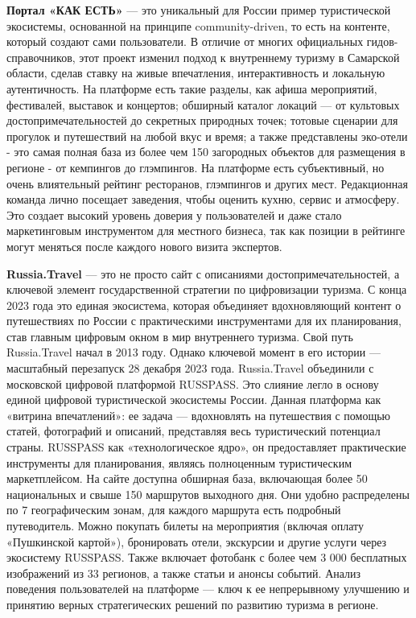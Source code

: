 \textbf{Портал «КАК ЕСТЬ»} --- это уникальный для России пример туристической экосистемы, основанной на принципе community-driven, то есть на контенте, который создают сами пользователи. В отличие от многих официальных гидов-справочников, этот проект изменил подход к внутреннему туризму в Самарской области, сделав ставку на живые впечатления, интерактивность и локальную аутентичность. На платформе есть такие разделы, как афиша мероприятий, фестивалей, выставок и концертов; обширный каталог локаций — от культовых достопримечательностей до секретных природных точек; тотовые сценарии для прогулок и путешествий на любой вкус и время; а также представлены эко-отели - это самая полная база из более чем 150 загородных объектов для размещения в регионе - от кемпингов до глэмпингов. На платформе есть субъективный, но очень влиятельный рейтинг ресторанов, глэмпингов и других мест. Редакционная команда лично посещает заведения, чтобы оценить кухню, сервис и атмосферу. Это создает высокий уровень доверия у пользователей и даже стало маркетинговым инструментом для местного бизнеса, так как позиции в рейтинге могут меняться после каждого нового визита экспертов. 

\textbf{Russia.Travel} --- это не просто сайт с описаниями достопримечательностей, а ключевой элемент государственной стратегии по цифровизации туризма. С конца 2023 года это единая экосистема, которая объединяет вдохновляющий контент о путешествиях по России с практическими инструментами для их планирования, став главным цифровым окном в мир внутреннего туризма. Свой путь Russia.Travel начал в 2013 году. Однако ключевой момент в его истории — масштабный перезапуск 28 декабря 2023 года. Russia.Travel объединили с московской цифровой платформой RUSSPASS. Это слияние легло в основу единой цифровой туристической экосистемы России. Данная платформа как «витрина впечатлений»: ее задача — вдохновлять на путешествия с помощью статей, фотографий и описаний, представляя весь туристический потенциал страны. RUSSPASS как «технологическое ядро», он предоставляет практические инструменты для планирования, являясь полноценным туристическим маркетплейсом. На сайте доступна обширная база, включающая более 50 национальных и свыше 150 маршрутов выходного дня. Они удобно распределены по 7 географическим зонам, для каждого маршрута есть подробный путеводитель. Можно покупать билеты на мероприятия (включая оплату «Пушкинской картой»), бронировать отели, экскурсии и другие услуги через экосистему RUSSPASS. Также включает фотобанк с более чем 3 000 бесплатных изображений из 33 регионов, а также статьи и анонсы событий. Анализ поведения пользователей на платформе — ключ к ее непрерывному улучшению и принятию верных стратегических решений по развитию туризма в регионе.
 
